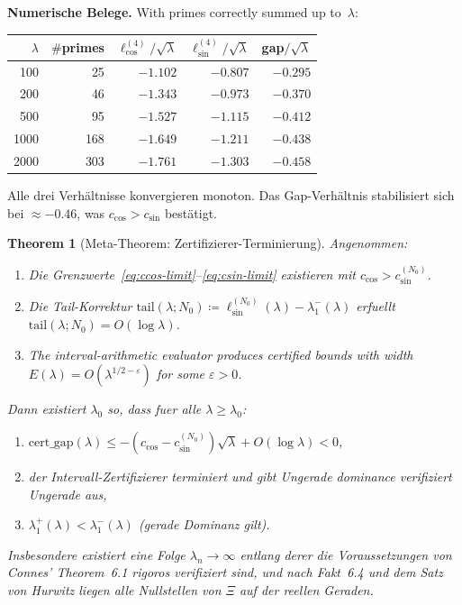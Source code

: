 \documentclass[12pt,a4paper]{article}
\newtheorem{theorem}{Theorem}[section]
\theoremstyle{definition}
\theoremstyle{remark}
\begin{document}
\noindent\textbf{Numerische Belege.} With primes correctly summed up to~$\lambda$:

\begin{center}
\renewcommand{\arraystretch}{1.15}
\begin{tabular}{r|r|r|r|r}
$\lambda$ & $\#$primes & $\ell_{\cos}^{(4)}/\sqrt{\lambda}$ & $\ell_{\sin}^{(4)}/\sqrt{\lambda}$ & gap$/\sqrt{\lambda}$ \\\hline
100  & 25  & $-1.102$ & $-0.807$ & $-0.295$ \\
200  & 46  & $-1.343$ & $-0.973$ & $-0.370$ \\
500  & 95  & $-1.527$ & $-1.115$ & $-0.412$ \\
1000 & 168 & $-1.649$ & $-1.211$ & $-0.438$ \\
2000 & 303 & $-1.761$ & $-1.303$ & $-0.458$
\end{tabular}
\end{center}

\noindent Alle drei Verhältnisse konvergieren monoton. Das Gap-Verhältnis stabilisiert sich bei $\approx -0.46$, was $c_{\cos} > c_{\sin}$ bestätigt.

\begin{theorem}[Meta-Theorem: Zertifizierer-Terminierung]
\label{thm:meta}
Angenommen:
\begin{enumerate}[label=\textup{(M\arabic*)}]
  \item\label{M1} Die Grenzwerte~\eqref{eq:ccos-limit}--\eqref{eq:csin-limit} existieren mit $c_{\cos} > c_{\sin}^{(N_0)}$.
  \item\label{M2} Die Tail-Korrektur $\mathrm{tail}(\lambda; N_0) \coloneqq \ell_{\sin}^{(N_0)}(\lambda) - \lambda_1^-(\lambda)$ erfuellt $\mathrm{tail}(\lambda; N_0) = O(\log\lambda)$.
  \item\label{M3} The interval-arithmetic evaluator produces certified bounds with width $E(\lambda) = O(\lambda^{1/2-\varepsilon})$ for some $\varepsilon > 0$.
\end{enumerate}
Dann existiert $\lambda_0$ so, dass fuer alle $\lambda \geq \lambda_0$:
\begin{enumerate}[label=\textup{(\roman*)}]
  \item $\mathrm{cert\_gap}(\lambda) \leq -(c_{\cos} - c_{\sin}^{(N_0)})\sqrt{\lambda} + O(\log\lambda) < 0$,
  \item der Intervall-Zertifizierer terminiert und gibt Ungerade dominance verifiziert Ungerade aus,
  \item $\lambda_1^+(\lambda) < \lambda_1^-(\lambda)$ (gerade Dominanz gilt).
\end{enumerate}
Insbesondere existiert eine Folge $\lambda_n \to \infty$ entlang derer die Voraussetzungen von Connes' Theorem~6.1 rigoros verifiziert sind, und nach Fakt~6.4 und dem Satz von Hurwitz liegen alle Nullstellen von $\Xi$ auf der reellen Geraden.
\end{theorem}
\end{document}
